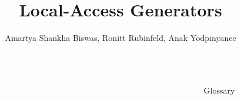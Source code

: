 \documentclass[final]{beamer}
\title{Local-Access Generators} %
\author{Amartya Shankha Biswas, Ronitt Rubinfeld, Anak Yodpinyanee} %
\institute{CSAIL, MIT} %
\newlength{\sepwid}
\newlength{\onecolwid}
\newlength{\twocolwid}
\begin{document}

\setlength{\belowcaptionskip}{2ex} %
\setlength\belowdisplayshortskip{2ex} %

\begin{frame}[t] %


\begin{columns}[t] %

\begin{column}{\sepwid}\end{column} %

\begin{column}{\onecolwid} %





\end{column} %


\begin{column}{\sepwid}\end{column} %


\begin{column}{\twocolwid} %




\end{column} %


\begin{column}{\sepwid}\end{column} %


\begin{column}{\onecolwid} %



\begin{block}{Glossary}

\end{block}


\end{column}
\end{columns}
\end{frame}
\end{document}
